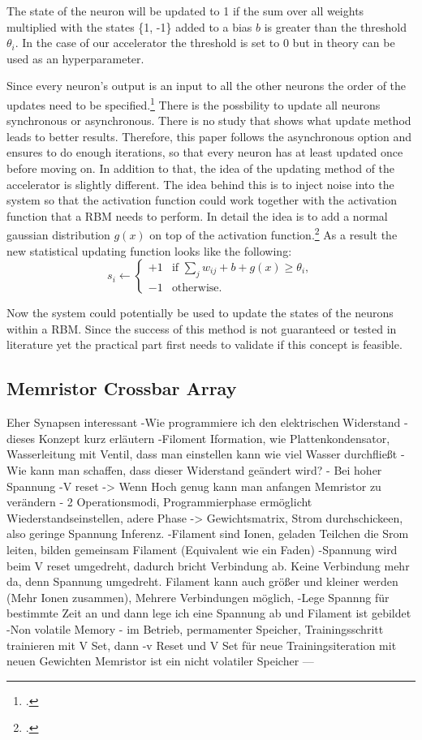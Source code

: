 The state of the neuron will be updated to 1 if the sum over all weights multiplied with the states \{1, -1\} added to a bias \( b \)  is greater than the threshold \( \theta_i \).
In the case of our accelerator the threshold is set to 0 but in theory can be used as an hyperparameter.

Since every neuron's output is an input to all the other neurons the order of the updates need to be specified.\footcite[cf.][506]{mackayInformationTheoryInference2003}
There is the possbility to update all neurons synchronous or asynchronous. 
There is no study that shows what update method leads to better results.
Therefore, this paper follows the asynchronous option and ensures to do enough iterations, so that every neuron has at least updated once before moving on.
In addition to that, the idea of the updating method of the accelerator is slightly different. The idea behind this is to inject noise into the system so that the activation function could work together with the activation function that a \ac{RBM} needs to perform. 
In detail the idea is to add a normal gaussian distribution \( g(x) \) on top of the activation function.\footcite[cf.][4-5]{bohmNoiseinjectedAnalogIsing2022}
As a result the new statistical updating function looks like the following:
\[
s_i \leftarrow 
\begin{cases} 
+1 & \text{if } \sum_j w_{ij}  + b + g(x) \geq \theta_i, \\
-1 & \text{otherwise}.
\end{cases}
\]

Now the system could potentially be used to update the states of the neurons within a \ac{RBM}.
Since the success of this method is not guaranteed or tested in literature yet the practical part first needs to validate if this concept is feasible.

\subsection{Memristor Crossbar Array}

Eher Synapsen interessant
-Wie programmiere ich den elektrischen Widerstand - dieses Konzept kurz erläutern
-Filoment Iformation, wie Plattenkondensator, Wasserleitung mit Ventil, dass man einstellen kann wie viel Wasser durchfließt
- Wie kann man schaffen, dass dieser Widerstand geändert wird?
- Bei hoher Spannung -V reset -> Wenn Hoch genug kann man anfangen Memristor zu verändern 
- 2 Operationsmodi, Programmierphase ermöglicht Wiederstandseinstellen, adere Phase -> Gewichtsmatrix, Strom durchschickeen, also 
geringe Spannung Inferenz. 
-Filament sind Ionen, geladen Teilchen die Srom leiten, bilden gemeinsam Filament (Equivalent wie ein Faden) 
-Spannung wird beim V reset umgedreht, dadurch bricht Verbindung ab. Keine Verbindung mehr da, denn Spannung umgedreht. 
Filament kann auch größer und kleiner werden (Mehr Ionen zusammen), Mehrere Verbindungen möglich,
-Lege Spannng für bestimmte Zeit an und dann lege ich eine Spannung ab und Filament ist gebildet
-Non volatile Memory - im Betrieb, permamenter Speicher, Trainingsschritt trainieren mit V Set, dann -v Reset und V Set für neue Trainingsiteration mit neuen Gewichten
Memristor ist ein nicht volatiler Speicher
---

